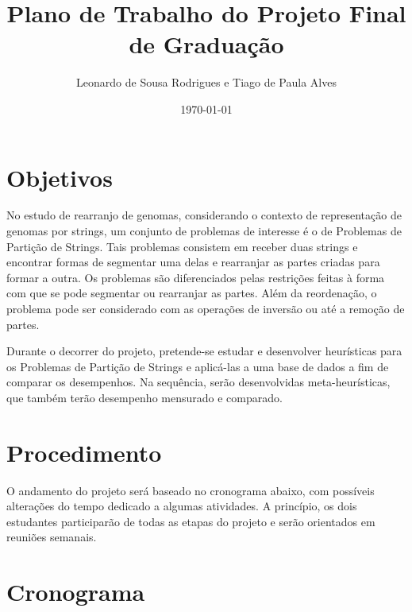 \documentclass[a4paper, 11pt]{article}
\title{Plano de Trabalho do Projeto Final de Graduação}
\author{Leonardo de Sousa Rodrigues e Tiago de Paula Alves}
\date{\today}
\begin{document}
    \maketitle

    \section{Objetivos}
        No estudo de rearranjo de genomas, considerando o contexto de representação de genomas por strings, um conjunto de problemas de interesse é o de Problemas de Partição de Strings. Tais problemas consistem em receber duas strings e encontrar formas de segmentar uma delas e rearranjar as partes criadas para formar a outra. Os problemas são diferenciados pelas restrições feitas à forma com que se pode segmentar ou rearranjar as partes. Além da reordenação, o problema pode ser considerado com as operações de inversão ou até a remoção de partes.

        Durante o decorrer do projeto, pretende-se estudar e desenvolver heurísticas para os Problemas de Partição de Strings e aplicá-las a uma base de dados a fim de comparar os desempenhos. Na sequência, serão desenvolvidas meta-heurísticas, que também terão desempenho mensurado e comparado.

    \section{Procedimento}

        O andamento do projeto será baseado no cronograma abaixo, com possíveis alterações do tempo dedicado a algumas atividades. A princípio, os dois estudantes participarão de todas as etapas do projeto e serão orientados em reuniões semanais.

    \section{Cronograma}
\end{document}
